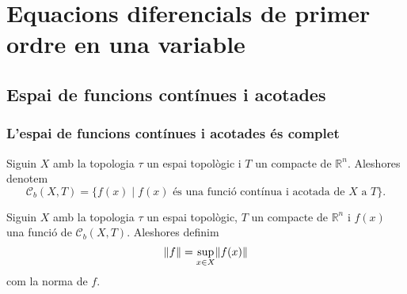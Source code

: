 \documentclass[../Apunts.tex]{subfiles}
\begin{document}
\chapter{Equacions diferencials de primer ordre en una variable}
	\section{Espai de funcions contínues i acotades}
	\subsection{L'espai de funcions contínues i acotades és complet}
	\begin{notation}
		\label{notation:espai de funcions contínues i acotades}
		Siguin \(X\) amb la topologia \(\tau\) un espai topològic i \(T\) un compacte de \(\mathbb{R}^{n}\). Aleshores denotem
		\[\mathcal{C}_{b}(X,T)=\{f(x)\mid f(x)\text{ és una funció contínua i acotada de }X\text{ a }T\}.\]
	\end{notation}
	\begin{definition}
		\label{def:norma d'una funció funció}
		Siguin \(X\) amb la topologia \(\tau\) un espai topològic, \(T\) un compacte de \(\mathbb{R}^{n}\) i \(f(x)\) una funció de \(\mathcal{C}_{b}(X,T)\). Aleshores definim
		\[\norm{f}=\sup_{x\in X}\norm{f(x)}\]
		com la norma de \(f\).
	\end{definition}
\end{document}

